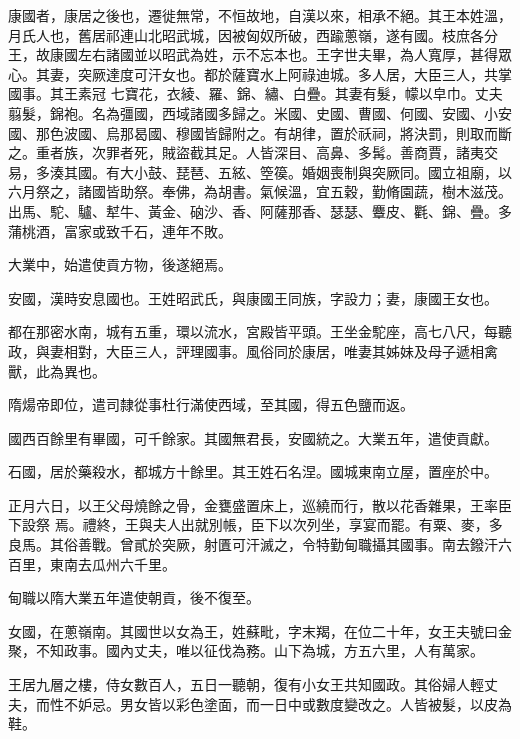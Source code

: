 \begin{pinyinscope}
 康國者，康居之後也，遷徙無常，不恒故地，自漢以來，相承不絕。其王本姓溫，月氏人也，舊居祁連山北昭武城，因被匈奴所破，西踰蔥嶺，遂有國。枝庶各分王，故康國左右諸國並以昭武為姓，示不忘本也。王字世夫畢，為人寬厚，甚得眾心。其妻，突厥達度可汗女也。都於薩寶水上阿祿迪城。多人居，大臣三人，共掌國事。其王素冠
 七寶花，衣綾、羅、錦、繡、白疊。其妻有髮，幪以皁巾。丈夫翦髮，錦袍。名為彊國，西域諸國多歸之。米國、史國、曹國、何國、安國、小安國、那色波國、烏那曷國、穆國皆歸附之。有胡律，置於祅祠，將決罰，則取而斷之。重者族，次罪者死，賊盜截其足。人皆深目、高鼻、多髯。善商賈，諸夷交易，多湊其國。有大小鼓、琵琶、五絃、箜篌。婚姻喪制與突厥同。國立祖廟，以六月祭之，諸國皆助祭。奉佛，為胡書。氣候溫，宜五穀，勤脩園蔬，樹木滋茂。出馬、駝、驢、犎牛、黃金、硇沙、香、阿薩那香、瑟瑟、麞皮、氍、錦、疊。多蒲桃酒，富家或致千石，連年不敗。



 大業中，始遣使貢方物，後遂絕焉。



 安國，漢時安息國也。王姓昭武氏，與康國王同族，字設力；妻，康國王女也。



 都在那密水南，城有五重，環以流水，宮殿皆平頭。王坐金駝座，高七八尺，每聽政，與妻相對，大臣三人，評理國事。風俗同於康居，唯妻其姊妹及母子遞相禽獸，此為異也。



 隋煬帝即位，遣司隸從事杜行滿使西域，至其國，得五色鹽而返。



 國西百餘里有畢國，可千餘家。其國無君長，安國統之。大業五年，遣使貢獻。



 石國，居於藥殺水，都城方十餘里。其王姓石名涅。國城東南立屋，置座於中。



 正月六日，以王父母燒餘之骨，金甕盛置床上，巡繞而行，散以花香雜果，王率臣下設祭
 焉。禮終，王與夫人出就別帳，臣下以次列坐，享宴而罷。有粟、麥，多良馬。其俗善戰。曾貳於突厥，射匱可汗滅之，令特勤甸職攝其國事。南去鏺汗六百里，東南去瓜州六千里。



 甸職以隋大業五年遣使朝貢，後不復至。



 女國，在蔥嶺南。其國世以女為王，姓蘇毗，字末羯，在位二十年，女王夫號曰金聚，不知政事。國內丈夫，唯以征伐為務。山下為城，方五六里，人有萬家。



 王居九層之樓，侍女數百人，五日一聽朝，復有小女王共知國政。其俗婦人輕丈夫，而性不妒忌。男女皆以彩色塗面，而一日中或數度變改之。人皆被髮，以皮為鞋。




\end{pinyinscope}
